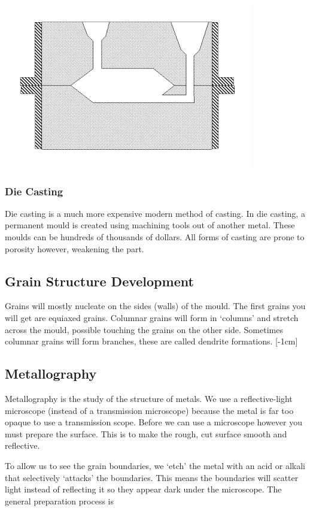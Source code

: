 \documentclass[12pt]{article}
\begin{document}
\begin{center}
\includegraphics[scale=0.8]{sandcasting}
\end{center}
\subsubsection{Die Casting}
Die casting is a much more expensive modern method of casting.
In die casting, a permanent mould is created using machining tools out of another metal.
These moulds can be hundreds of thousands of dollars.
All forms of casting are prone to porosity however, weakening the part.

\subsection{Grain Structure Development}
Grains will mostly nucleate on the sides (walls) of the mould.
The first grains you will get are equiaxed grains.
Columnar grains will form in `columns' and stretch across the mould, possible touching the grains on the other side.
Sometimes columnar grains will form branches, these are called dendrite formations.
[-1cm]

\subsection{Metallography} 
Metallography is the study of the structure of metals. 
We use a reflective-light microscope (instead of a transmission microscope) because the metal is far too opaque to use a transmission scope.
Before we can use a microscope however you must prepare the surface.
This is to make the rough, cut surface smooth and reflective.

To allow us to see the grain boundaries, we `etch' the metal with an acid or alkali that selectively `attacks' the boundaries.
This means the boundaries will scatter light instead of reflecting it so they appear dark under the microscope. 
The general preparation process is
\end{document}
